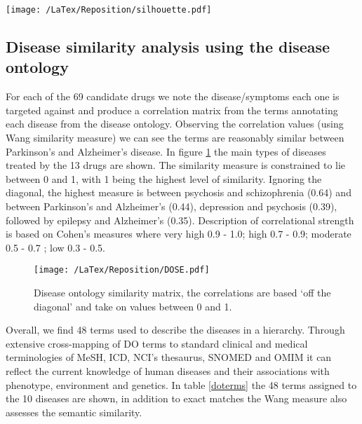 \documentclass[preprint,12pt]{elsarticle}
\begin{document}
\begin{figure*}[h]
  \begin{center}
	 \texttt{[image: /LaTex/Reposition/silhouette.pdf]} %
  \end{center}
 \caption{Silhouette plot determining goodness of fit of the clusters}
\label{silly}
\end{figure*}


\subsection{Disease similarity analysis using the disease ontology}
For each of the 69 candidate drugs we note the disease/symptoms each one is targeted against and produce a correlation  matrix from the terms annotating each disease from the disease ontology. Observing the correlation values (using Wang similarity measure) we can see the terms are reasonably similar between Parkinson's and Alzheimer's disease. In figure \ref{dose1} the main types of diseases treated by the 13 drugs are shown. The similarity measure is constrained to lie between 0 and 1, with 1 being the highest level of similarity. Ignoring the diagonal, the highest measure is between psychosis and schizophrenia (0.64) and between Parkinson's and Alzheimer's (0.44), depression and psychosis (0.39), followed by epilepsy and Alzheimer's (0.35). Description of correlational strength is based on Cohen's measures where very high 0.9 - 1.0; high 0.7 - 0.9; moderate 0.5 - 0.7 ; low 0.3 - 0.5.


\begin{figure}[h]
  \begin{center}
	 \texttt{[image: /LaTex/Reposition/DOSE.pdf]} %
  \end{center}
 \caption{Disease ontology similarity matrix, the correlations are based `off the diagonal' and take on values between 0 and 1.}
\label{dose1}
\end{figure}

Overall, we find 48 terms used to describe the diseases  in a hierarchy. Through extensive cross-mapping of DO terms to standard clinical and medical terminologies of MeSH, ICD, NCI's thesaurus, SNOMED and OMIM it can reflect the current knowledge of human diseases and their associations with phenotype, environment and genetics.  In table \ref{doterms} the 48 terms assigned to the 10 diseases are shown, in addition to exact matches the Wang measure also assesses the semantic similarity.
\end{document}
